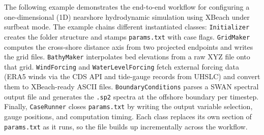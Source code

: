\documentclass[preprint,12pt, a4paper]{elsarticle}
\begin{document}
The following example demonstrates the end-to-end workflow for configuring a one-dimensional (1D) nearshore hydrodynamic simulation using XBeach under surfbeat mode. The example chains different instantiated classes: \texttt{Initializer} creates the folder structure and stamps \texttt{params.txt} with case flags. \texttt{GridMaker} computes the cross-shore distance axis from two projected endpoints and writes the grid files. \texttt{BathyMaker} interpolates bed elevations from a raw XYZ file onto that grid. \texttt{WindForcing} and \texttt{WaterLevelForcing} fetch external forcing data (ERA5 winds via the CDS API and tide-gauge records from UHSLC) and convert them to XBeach-ready ASCII files. \texttt{BoundaryConditions} parses a SWAN spectral output file and generates the \texttt{.sp2} spectra at the offshore boundary per timestep. Finally, \texttt{CaseRunner} closes \texttt{params.txt} by writing the output variable selection, gauge positions, and computation timing. Each class replaces its own section of \texttt{params.txt} as it runs, so the file builds up incrementally across the workflow.
               
\end{document}
